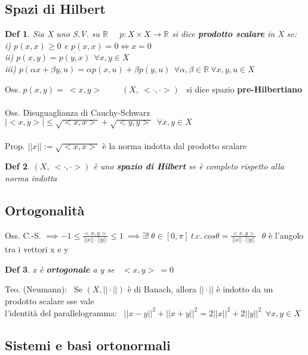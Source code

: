 \documentclass{article}
\theoremstyle{unnumbered}
\newtheorem* {theoremT}{Def}
\theoremstyle{unnumbered1}
\newenvironment{defi}{\begin{gBox}\begin{theoremT}}{\end{theoremT}\end{gBox}}
\begin{document}
\subsection{Spazi di Hilbert}

\begin{defi}
Sia X uno S.V. su $\mathbb{R}$ \ \  $p:X\times X\to \mathbb{R}$ si dice \textbf{prodotto scalare} in X se:\\
i) $p(x,x)\ge 0$ e $p(x,x)=0 \Leftrightarrow x=0$\\
ii) $p(x,y)=\overline{p(y,x)} \ \ \forall x,y \in X$\\
iii) $p(\alpha x +\beta y, u)=\alpha p(x,u) + \beta p(y,u) \ \ \forall \alpha, \beta \in \mathbb{R} \ \forall x,y,u \in X$
\end{defi}
%
Oss. $p(x,y)= \ <x,y>$ \ \ \ \ $(X,\ <\cdot,\cdot>
)$ \ si dice spazio \textbf{pre-Hilbertiano}\\ \\
%
Oss. Disuguaglianza di Cauchy-Schwarz $|<x,y>|\le \sqrt{<x,x>}+\sqrt{<y,y>} \ \ \forall x,y \in X$\\ \\
%
%
Prop. $||x||:=\sqrt{<x,x>}$ è la norma indotta dal prodotto scalare\\

\begin{defi}
$(X,\ <\cdot,\cdot>)$ è uno \textbf{spazio di Hilbert} se è completo rispetto alla norma indotta
\end{defi}





\subsection{Ortogonalità}
%
Oss. C.-S. $\implies -1\le\frac{<x,y>}{||x||\cdot||y||}\le 1 \ \implies \exists !\ \theta\in [0,\pi] \ t.c. \ cos\theta=\frac{<x,y>}{||x||\cdot||y||} \ \ \ \theta$ è l'angolo tra i vettori x e y

\begin{defi}
x è \textbf{ortogonale} a y se \ $<x,y>\ =0$
\end{defi}
%
Teo. (Neumann): \ Se $(X,||\cdot||)$ è di Banach, allora $||\cdot||$ è indotto da un prodotto scalare sse vale\\ l'identità del parallelogramma: \ $||x-y||^2+||x+y||^2=2||x||^2+2||y||^2 \ \ \forall x,y\in X$ \\


\subsection{Sistemi e basi ortonormali}
\end{document}
